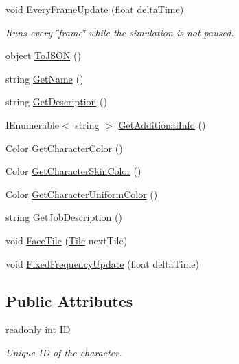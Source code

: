 \begin{DoxyCompactItemize}
\item 
void \hyperlink{class_project_porcupine_1_1_entities_1_1_character_ae3c85ddd163fbb4680572fb03e7fc6fc}{Every\+Frame\+Update} (float delta\+Time)
\begin{DoxyCompactList}\small\item\em Runs every \char`\"{}frame\char`\"{} while the simulation is not paused. \end{DoxyCompactList}\item 
object \hyperlink{class_project_porcupine_1_1_entities_1_1_character_a1df031072d90268d3ada823657d95440}{To\+J\+S\+ON} ()
\item 
string \hyperlink{class_project_porcupine_1_1_entities_1_1_character_abe834c84bb93ab0518c92452a33d18e5}{Get\+Name} ()
\item 
string \hyperlink{class_project_porcupine_1_1_entities_1_1_character_aad98e60530da392f0d4ee0efd0d8cb7c}{Get\+Description} ()
\item 
I\+Enumerable$<$ string $>$ \hyperlink{class_project_porcupine_1_1_entities_1_1_character_a25f40156785cb40c6bfc3496e27262b9}{Get\+Additional\+Info} ()
\item 
Color \hyperlink{class_project_porcupine_1_1_entities_1_1_character_ad5653d3e619be5640031bb743dece241}{Get\+Character\+Color} ()
\item 
Color \hyperlink{class_project_porcupine_1_1_entities_1_1_character_acf17f0334c731644375dfd1d55244b63}{Get\+Character\+Skin\+Color} ()
\item 
Color \hyperlink{class_project_porcupine_1_1_entities_1_1_character_a7bd0d5d0c5b73b18f2f47e63035798a1}{Get\+Character\+Uniform\+Color} ()
\item 
string \hyperlink{class_project_porcupine_1_1_entities_1_1_character_a8bdbe6c8bd400cb777f7c6e34f54c29b}{Get\+Job\+Description} ()
\item 
void \hyperlink{class_project_porcupine_1_1_entities_1_1_character_ac0d176f59c1c385b90be580ab3cfa020}{Face\+Tile} (\hyperlink{class_tile}{Tile} next\+Tile)
\item 
void \hyperlink{class_project_porcupine_1_1_entities_1_1_character_a9ac39404237d8a6f3da2688bc4ab9c13}{Fixed\+Frequency\+Update} (float delta\+Time)
\end{DoxyCompactItemize}
\subsection*{Public Attributes}
\begin{DoxyCompactItemize}
\item 
readonly int \hyperlink{class_project_porcupine_1_1_entities_1_1_character_a0e5fccdb1459c7c2ab72c2f6e8faf3ec}{ID}
\begin{DoxyCompactList}\small\item\em Unique ID of the character. \end{DoxyCompactList}\end{DoxyCompactItemize}
